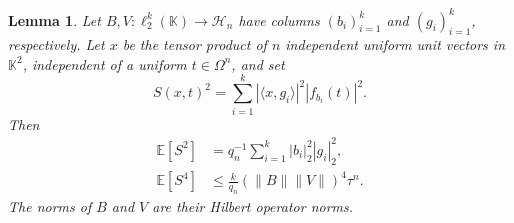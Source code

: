 \documentclass[11pt,a4paper,reqno]{amsart}
\newtheorem{lemma}[lemma]{Lemma}
\theoremstyle{definition}
\newcommand{\norm}[1]{\lVert #1\rVert}
\numberwithin{equation}{section}
\begin{document}
\begin{lemma}\label{lem:fourth-moment}
Let $B,V\colon\ell_2^k(\mathbb K)\to\mathcal H_n$ have columns $(b_i)_{i=1}^k$ and $(g_i)_{i=1}^k$, respectively. Let $x$ be the tensor product of $n$ independent uniform unit vectors in $\mathbb K^2$, independent of a uniform $t\in\Omega^n$, and set
\begin{equation*}
 S(x,t)^2=\sum_{i=1}^k|\langle x,g_i\rangle|^2|f_{b_i}(t)|^2.
\end{equation*}
Then
\begin{align}
 \mathbb E[S^2]&=q_n^{-1}\sum_{i=1}^k|b_i|_2^2|g_i|_2^2,
                                      \label{eq:square-second}\\
 \mathbb E[S^4]&\leq\frac{k}{q_n}(\norm B\norm V)^4\tau^n.
                                      \label{eq:square-fourth}
\end{align}
The norms of $B$ and $V$ are their Hilbert operator norms.
\end{lemma}
\end{document}
